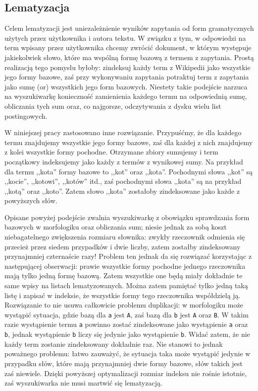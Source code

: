 \documentclass[a4paper,12pt]{article}
\begin{document}
\subsection{Lematyzacja}
Celem lematyzacji jest uniezależnienie wyników zapytania od form gramatycznych
użytych przez użytkownika i autora tekstu. W związku z tym, w odpowiedzi na term
wpisany przez użytkownika chcemy zwrócić dokument, w którym występuje
jakiekolwiek słowo, które ma wspólną formę bazową z termem z zapytania. Prostą
realizacją tego pomysłu byłoby: zindeksuj każdy term z Wikipedii jako wszystkie
jego formy bazowe, zaś przy wykonywaniu zapytania potraktuj term z zapytania
jako sumę (or) wszystkich jego form bazowych. Niestety takie podejście narzuca
na wyszukiwarkę konieczność zamienienia każdego termu na odpowiednią sumę,
obliczania tych sum oraz, co najgorsze, odczytywania z dysku wielu list
postingowych.

W niniejszej pracy zastosowano inne rozwiązanie. Przypuśćmy, że dla każdego
termu znajdujemy wszystkie jego formy bazowe, zaś dla każdej z nich znajdujemy
z kolei wszystkie formy pochodne. Otrzymane zbiory sumujemy i term początkowy
indeksujemy jako każdy z termów z wynikowej sumy. Na przykład dla termu
,,kota'' formy bazowe to ,,kot'' oraz ,,kota''. Pochodnymi słowa ,,kot'' są
,,kocie'', ,,kotowi'', ,,kotów'' itd., zaś pochodnymi słowa ,,kota'' są
na przykład ,,kotą'' oraz ,,koto''. Zatem słowo ,,kota'' zostałoby zindeksowane
jako każde z powyższych słów.

Opisane powyżej podejście zwalnia wyszukiwarkę z obowiązku sprawdzania form
bazowych w morfologiku oraz obliczania sum; niesie jednak za sobą koszt
niebagatelnego zwiększenia rozmiaru słownika: zwykły rzeczownik odmienia się
przecież przez siedem przypadków i dwie liczby, zatem zostałby zindeksowany
przynajmniej czternaście razy! Problem ten jednak da się rozwiązać korzystając
z następującej obserwacji: prawie wszystkie formy pochodne jednego rzeczownika
mają tylko jedną formę bazową. Zatem wszystkie one będą miały dokładnie te same
wpisy na listach lematyzowanych. Można zatem pamiętać tylko jedną taką listę
i zapisać w indeksie, że wszystkie formy tego rzeczownika współdzielą ją.
Rozwiązanie to nie usuwa całkowicie problemu duplikacji: w morfologiku może
wystąpić sytuacja, gdzie bazą dla \texttt{a} jest \texttt{A}, zaś bazą dla
\texttt{b} jest \texttt{A} oraz \texttt{B}. W takim razie wystąpienie termu
\texttt{a} powinno zostać zindeksowane jako wystąpienie \texttt{a} oraz
\texttt{b}, jednak wystąpienie \texttt{b} liczy się jedynie jako wystąpienie
\texttt{b}. Widać zatem, że nie każdy term zostanie zindeksowany dokładnie raz.
Nie stanowi to jednak poważnego problemu: łatwo zauważyć, że sytuacja taka może
wystąpić jedynie w przypadku słów, które mają przynajmniej dwie formy bazowe,
słów takich jest zaś niewiele. Dzięki powyższej optymalizacji rozmiar indeksu
nie rośnie istotnie, zaś wyszukiwarka nie musi martwić się lematyzacją.
\end{document}
